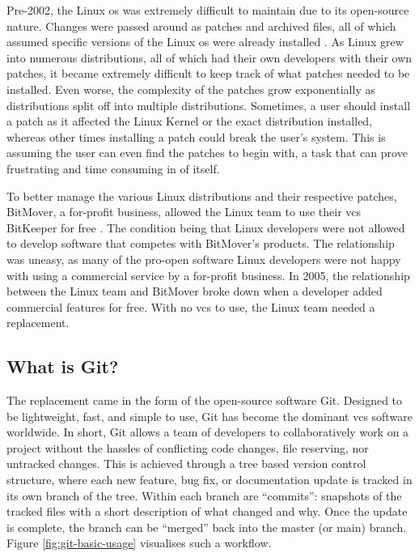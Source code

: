 \documentclass[11pt]{article}
\begin{document}
Pre-2002, the Linux \acrshort{os} was extremely difficult to maintain due to its open-source nature. Changes were passed around as patches and archived files, all of which assumed specific versions of the Linux \acrshort{os} were already installed \cite{git-short-history}. As Linux grew into numerous distributions, all of which had their own developers with their own patches, it became extremely difficult to keep track of what patches needed to be installed. Even worse, the complexity of the patches grow exponentially as distributions split off into multiple distributions. Sometimes, a \gls{user} should install a patch as it affected the Linux Kernel or the exact distribution installed, whereas other times installing a patch could break the user's system. This is assuming the user can even find the patches to begin with, a task that can prove frustrating and time consuming in of itself.

To better manage the various Linux distributions and their respective patches, BitMover, a for-profit business, allowed the Linux team to use their \acrfull{vcs} BitKeeper for free \cite{git-short-history}. The condition being that Linux developers were not allowed to develop software that competes with BitMover's products. The relationship was uneasy, as many of the pro-open software Linux developers were not happy with using a commercial service by a for-profit business. In 2005, the relationship between the Linux team and BitMover broke down when a developer added commercial features for free. With no \acrshort{vcs} to use, the Linux team needed a replacement.

\subsection{What is Git?}

The replacement came in the form of the open-source software Git. Designed to be lightweight, fast, and simple to use, Git has become the dominant \acrshort{vcs} software worldwide. In short, Git allows a team of developers to collaboratively work on a project without the hassles of conflicting code changes, file reserving, nor untracked changes. This is achieved through a tree based version control structure, where each new feature, bug fix, or documentation update is tracked in its own branch of the tree. Within each branch are ``commits'': snapshots of the tracked files with a short description of what changed and why. Once the update is complete, the branch can be ``merged'' back into the master (or main) branch. Figure \ref{fig:git-basic-usage} visualises such a workflow.
\end{document}
